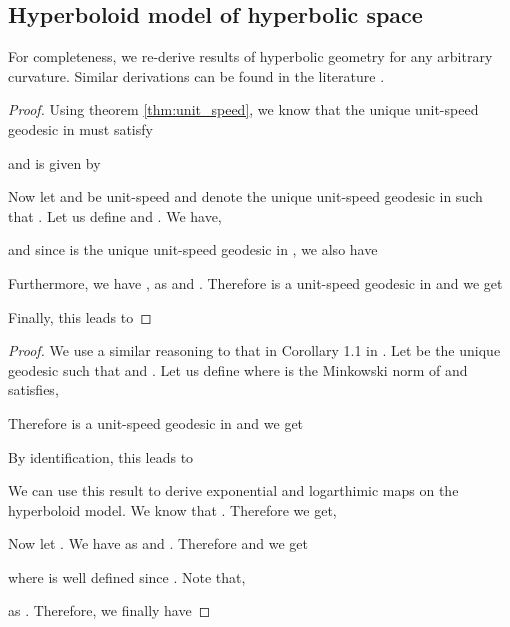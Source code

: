 \documentclass{article}
\begin{document}
\subsection{Hyperboloid model of hyperbolic space}
For completeness, we re-derive results of hyperbolic geometry for any arbitrary curvature. 
Similar derivations can be found in the literature \cite{wilson2014spherical}.
\geodesics*
\begin{proof}
Using theorem \ref{thm:unit_speed}, we know that the unique unit-speed geodesic  in  must satisfy

and is given by

Now let  and  be unit-speed
and denote  the unique unit-speed geodesic in  such that 
. 
Let us define  and . We have,

and since  is the unique unit-speed geodesic in , we also have

Furthermore, we have ,  as  and .
Therefore  is a unit-speed geodesic in  and we get

Finally, this leads to 


\begin{comment}
We know that the unique unit-speed geodesic  in  must satisfy

Let . 
We have . 
Furthermore, since , we have  and for all :

Therefore,  is a curve on . 
Furthermore, we have  and therefore

Finally,  verifies all the conditions in Equation \ref{eq:geodesic_cond} and is therefore the unique unit-speed geodesic on  such that  and . 
\end{comment}
\end{proof}

\logexp*
\begin{proof}
We use a similar reasoning to that in Corollary 1.1 in \cite{ganea2018hyperbolic}.
Let  be the unique geodesic such that  and .
Let us define  where  is the Minkowski norm of 
and 
 satisfies,

Therefore  is a unit-speed geodesic in  and we get

By identification, this leads to 

We can use this result to derive exponential and logarthimic maps on the hyperboloid model.
We know that . 
Therefore we get,

Now let .
We have  as  
and .
Therefore  and we get

where  is well defined since .
Note that,

as .
Therefore, we finally have

\end{proof}
\end{document}
